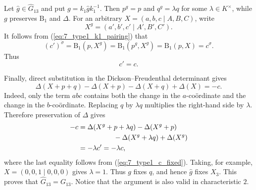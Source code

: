\documentclass{amsart}
\renewcommand{\hat}{\widehat}
\newcommand{\B}{\mathrm{B}}
\newcommand{\s}{\sigma}
\newcommand{\fdet}{\Delta}
\theoremstyle{plain}
\numberwithin{theorem}{section}
\theoremstyle{definition}
\begin{document}
Let $\hat g\in\hat G_{13}$ and put $g=k_1 \hat{g} k_1^{-1}$.
Then $p^{g}=p$ and $q^{g}=\lambda q$ for some
$\lambda\in K^{\times}$, while $g$ preserves $\B_1$ and
$\fdet$.  For an arbitrary $X=(a,b,c\mid A,B,C)$, write
\begin{equation*}
	 X^{g}=(a',b',c'\mid A',B',C').
\end{equation*}
It follows from (\ref{eq:7_type1_k1_pairing}) that
\begin{equation*}
	 (c')^{\s}=\B_1(p,X^{g})
	 =\B_1(p^g,X^{g})
	 =\B_1(p,X)=c^{\s}.
\end{equation*}
Thus
\begin{equation}
	 \label{eq:7_type1_c_fixed}
	 c'=c.
\end{equation}

Finally, direct substitution in the Dickson--Freudenthal determinant
gives
\begin{equation*}
	 \fdet(X+p+q)-\fdet(X+p)-\fdet(X+q)+\fdet(X)=-c.
\end{equation*}
Indeed, only the term $abc$ contains both the change in the
$a$-co\"{o}rdinate and the change in the $b$-co\"{o}rdinate.
Replacing $q$ by $\lambda q$ multiplies the right-hand side by
$\lambda$.  Therefore preservation of $\fdet$ gives
\begin{align*}
	 -c
	 &=\fdet(X^{g}+p+\lambda q)-\fdet(X^{g}+p)\\
	 &\hspace{18mm}-\fdet(X^{g}+\lambda q)+\fdet(X^{g})\\
	 &=-\lambda c'=-\lambda c,
\end{align*}
where the last equality follows from (\ref{eq:7_type1_c_fixed}).
Taking, for example, $X=(0,0,1\mid0,0,0)$ gives $\lambda=1$.
Thus $g$ fixes $q$, and hence $\hat{g}$ fixes $X_3$.  This
proves that $\hat G_{13}=G_{13}$. Notice that the argument is also 
valid in characteristic $2$.
\end{document}
